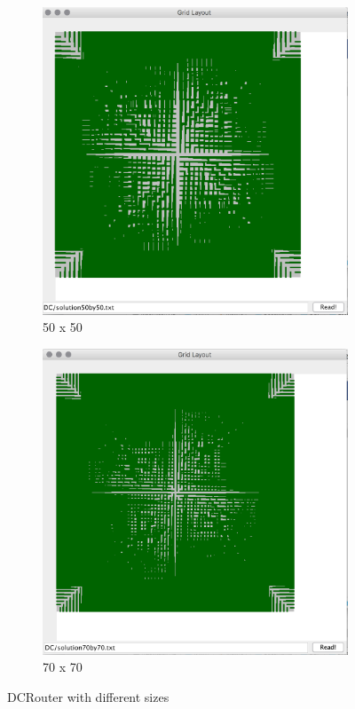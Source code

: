 \documentclass{article}
\begin{document}
\begin{spacing}{1.1}
\begin{figure}[H]
\begin{subfigure}{0.3\textwidth}
            \includegraphics[width = \textwidth]{DC2.png}
            \caption{50 x 50}
        \end{subfigure}
        \begin{subfigure}{0.3\textwidth}
            \includegraphics[width = \textwidth]{DC3.png}
            \caption{70 x 70}
        \end{subfigure}
        \caption{DCRouter with different sizes}
    \end{figure}

\end{spacing}
\end{document}

